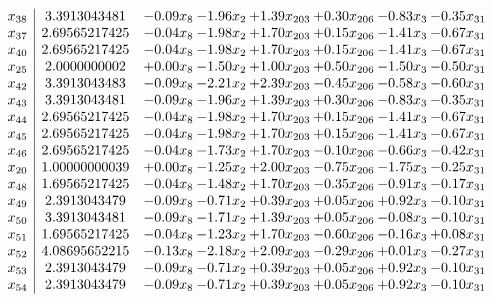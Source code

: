 \documentclass[8pt]{article}
\begin{document}
\[\begin{array}{c| c c@{\hskip 2pt} c@{\hskip 2pt} c@{\hskip 2pt} c@{\hskip 2pt} c@{\hskip 2pt} c@{\hskip 2pt} }
 x_{38}   &  3.3913043481 & -0.09 x_{8} & -1.96 x_{2} & +  1.39 x_{203} & +  0.30 x_{206} & -0.83 x_{3} & -0.35 x_{31}\\
 x_{37}   &  2.69565217425 & -0.04 x_{8} & -1.98 x_{2} & +  1.70 x_{203} & +  0.15 x_{206} & -1.41 x_{3} & -0.67 x_{31}\\
 x_{40}   &  2.69565217425 & -0.04 x_{8} & -1.98 x_{2} & +  1.70 x_{203} & +  0.15 x_{206} & -1.41 x_{3} & -0.67 x_{31}\\
 x_{25}   &  2.0000000002 & +  0.00 x_{8} & -1.50 x_{2} & +  1.00 x_{203} & +  0.50 x_{206} & -1.50 x_{3} & -0.50 x_{31}\\
 x_{42}   &  3.3913043483 & -0.09 x_{8} & -2.21 x_{2} & +  2.39 x_{203} & -0.45 x_{206} & -0.58 x_{3} & -0.60 x_{31}\\
 x_{43}   &  3.3913043481 & -0.09 x_{8} & -1.96 x_{2} & +  1.39 x_{203} & +  0.30 x_{206} & -0.83 x_{3} & -0.35 x_{31}\\
 x_{44}   &  2.69565217425 & -0.04 x_{8} & -1.98 x_{2} & +  1.70 x_{203} & +  0.15 x_{206} & -1.41 x_{3} & -0.67 x_{31}\\
 x_{45}   &  2.69565217425 & -0.04 x_{8} & -1.98 x_{2} & +  1.70 x_{203} & +  0.15 x_{206} & -1.41 x_{3} & -0.67 x_{31}\\
 x_{46}   &  2.69565217425 & -0.04 x_{8} & -1.73 x_{2} & +  1.70 x_{203} & -0.10 x_{206} & -0.66 x_{3} & -0.42 x_{31}\\
 x_{20}   &  1.00000000039 & +  0.00 x_{8} & -1.25 x_{2} & +  2.00 x_{203} & -0.75 x_{206} & -1.75 x_{3} & -0.25 x_{31}\\
 x_{48}   &  1.69565217425 & -0.04 x_{8} & -1.48 x_{2} & +  1.70 x_{203} & -0.35 x_{206} & -0.91 x_{3} & -0.17 x_{31}\\
 x_{49}   &  2.3913043479 & -0.09 x_{8} & -0.71 x_{2} & +  0.39 x_{203} & +  0.05 x_{206} & +  0.92 x_{3} & -0.10 x_{31}\\
 x_{50}   &  3.3913043481 & -0.09 x_{8} & -1.71 x_{2} & +  1.39 x_{203} & +  0.05 x_{206} & -0.08 x_{3} & -0.10 x_{31}\\
 x_{51}   &  1.69565217425 & -0.04 x_{8} & -1.23 x_{2} & +  1.70 x_{203} & -0.60 x_{206} & -0.16 x_{3} & +  0.08 x_{31}\\
 x_{52}   &  4.08695652215 & -0.13 x_{8} & -2.18 x_{2} & +  2.09 x_{203} & -0.29 x_{206} & +  0.01 x_{3} & -0.27 x_{31}\\
 x_{53}   &  2.3913043479 & -0.09 x_{8} & -0.71 x_{2} & +  0.39 x_{203} & +  0.05 x_{206} & +  0.92 x_{3} & -0.10 x_{31}\\
 x_{54}   &  2.3913043479 & -0.09 x_{8} & -0.71 x_{2} & +  0.39 x_{203} & +  0.05 x_{206} & +  0.92 x_{3} & -0.10 x_{31}\\

\end{array}\]
\end{document}
